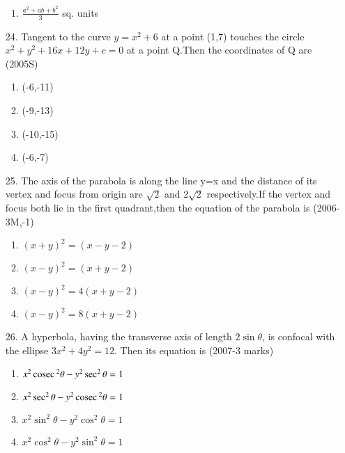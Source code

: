 \documentclass[journal,12pt,twocolumn]{IEEEtran}
\theoremstyle{remark}
\begin{document}
\begin{enumerate}
\begin{enumerate}
    \item $\frac{a^{2}+ab+b^{2}}{3}$ sq. units\\
\end{enumerate}
\item[24.] Tangent to the curve $y=x^{2}+6$ at a point (1,7) touches the circle $x^{2}+y^{2}+16x+12y+c=0$ at a point Q.Then the coordinates of Q are \hfill{(2005S)}
\begin{enumerate}
    \item(-6,-11)\\
    \item (-9,-13)\\
    \item(-10,-15)\\
    \item(-6,-7)\\
\end{enumerate}
\item[25.] The axis of the parabola is along the line y=x and the distance of its vertex and focus from  origin are $\sqrt2$ and $2\sqrt2$  respectively.If the vertex and focus both lie in the first quadrant,then the equation of the parabola is \hfill{(2006-3M,-1)}
\begin{enumerate}
    \item $(x+y)^{2}=(x-y-2)$\\
    \item $(x-y)^{2}=(x+y-2)$\\
    \item $(x-y)^{2}=4(x+y-2)$\\
    \item $(x-y)^{2}=8(x+y-2)$\\
\end{enumerate}
\item[26.] A hyperbola, having the transverse axis of length $2\sin\theta$, is confocal with the ellipse $3x^{2}+4y^{2}=12$. Then its equation is \hfill{(2007-3 marks)}
\begin{enumerate}
    \item $x^{2}\,\text{cosec}\,^{2}\theta-y^{2}\sec^{2}\theta=1$\\
    \item $x^{2}\sec^{2}\theta-y^{2}\,\text{cosec}\,^{2}\theta=1$\\
    \item $x^{2}\sin^{2}\theta-y^{2}\cos^{2}\theta=1$\\
    \item $x^{2}\cos^{2}\theta-y^{2}\sin^{2}\theta=1$\\
\end{enumerate}

\end{enumerate}
\end{document}

